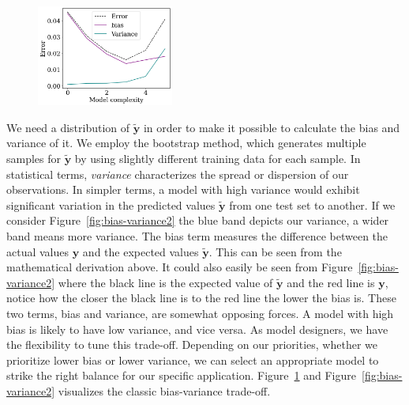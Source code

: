 \documentclass[twoside,11pt]{report}
\begin{document}
\begin{figure}
    \begin{center}
        \includegraphics[width=0.4\textwidth]{../runsAndAdditions/bias-variance1.png}
    \end{center}
        \caption{}\label{fig:bias-variance1}
\end{figure}
We need a distribution of $\mathbf{\tilde{y}}$ in order to make it possible to calculate the bias and variance of it.
We employ the bootstrap method, which generates 
multiple samples for $\mathbf{\tilde{y}}$ by using slightly different training data for each sample.
In statistical terms, \emph{variance} characterizes the spread or dispersion of our observations.
In simpler terms, a model with high variance would exhibit significant variation in the predicted values 
$\mathbf{\tilde{y}}$ from one test set to another.
If we consider Figure~\ref{fig:bias-variance2} the blue band depicts our variance, a wider band means more variance. 
The bias term measures the difference between the actual values $\mathbf{y}$ and the
expected values $\mathbf{\tilde{y}}$. This can be seen from the mathematical derivation above.
It could also easily be seen from Figure~\ref{fig:bias-variance2} where the black line is the expected value of $\mathbf{\tilde{y}}$ and 
the red line is $\mathbf{y}$, notice how the closer the black line is to the red line the lower the bias is.
These two terms, bias and variance, are somewhat opposing forces. A model with high bias is likely to 
have low variance, and vice versa. As model designers, we have the flexibility to tune this trade-off. 
Depending on our priorities, whether we prioritize lower bias or lower variance, we can select an appropriate 
model to strike the right balance for our specific application.
Figure~\ref{fig:bias-variance1} and Figure~\ref{fig:bias-variance2} visualizes the classic bias-variance trade-off.
\end{document}
